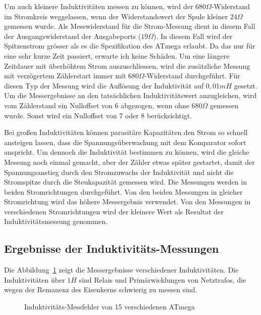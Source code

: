 Um auch kleinere Induktivitäten messen zu können, wird der \(680\Omega\)-Widerstand im Stromkreis weggelassen,
wenn der Widerstandswert der Spule kleiner \(24\Omega\) gemessen wurde. Als Messwiderstand für die Strom-Messung
dient in diesem Fall der Ausgangswiderstand der Ausgabeports (\(19\Omega\)). In diesem Fall wird der Spitzenstrom grösser
als es die Spezifikation des ATmega erlaubt. Da das nur für eine sehr kurze Zeit passiert, erwarte ich keine Schäden.
Um eine längere Zeitdauer mit überhöhtem Strom auszuschliessen, wird die zusätzliche Messung mit 
verzögertem Zählerstart immer mit \(680\Omega\)-Widerstand durchgeführt.
Für diesen Typ der Messung wird die Auflösung der Induktivität auf \(0,01mH\) gesetzt.
Um die Messergebnisse an den tatsächlichen Induktivitätswert anzugleichen, wird vom Zählerstand ein
Nulloffset von 6 abgezogen, wenn ohne \(680\Omega\) gemessen wurde. Sonst wird ein Nulloffset von 7 oder 8 berücksichtigt.


Bei großen Induktivitäten können parasitäre Kapazitäten den Strom so schnell ansteigen lassen, dass
die Spannungsüberwachung mit dem Komparator sofort anspricht. Um dennoch die Induktivität bestimmen zu
können, wird die gleiche Messung noch einmal gemacht, aber der Zähler etwas später gestartet, damit
der Spannungsanstieg durch den Stromzuwachs der Induktivität und nicht die Stromspitze durch die
Steukapazität gemessen wird.
Die Messungen werden in beiden Stromrichtungen durchgeführt.
Von den beiden Messungen in gleicher Stromrichtung wird das höhere Messergebnis verwendet.
Von den Messungen in verschiedenen Stromrichtungen wird der kleinere Wert als Resultat der Induktivitätsmessung genommen.

\subsection{Ergebnisse der Induktivitäts-Messungen}
Die Abbildung~\ref{fig:Induct328p} zeigt die Messergebnisse verschiedener Induktivitäten.
Die Induktivitäten über \(1 H\) sind Relais und Primärwicklungen von Netztrafos, die wegen
der Remanenz des Eisenkerns schwierig zu messen sind.

\begin{figure}[H]
\centering

\caption{Induktivitäts-Messfehler von 15 verschiedenen ATmega}
\label{fig:Induct328p}
\end{figure}
